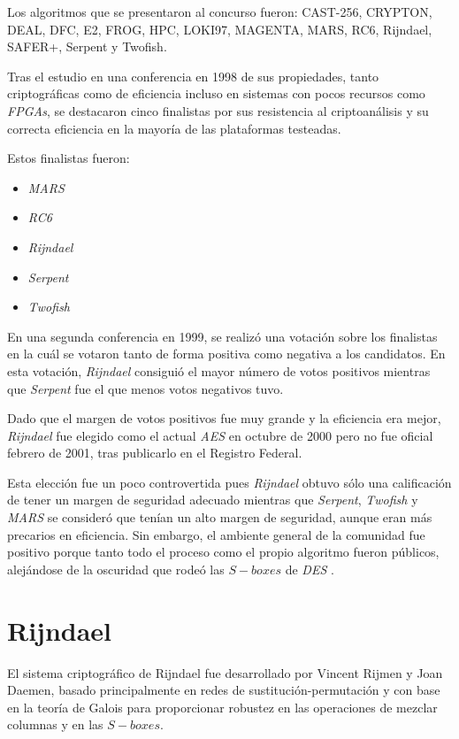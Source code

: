 Los algoritmos que se presentaron al concurso fueron: CAST-256, CRYPTON, DEAL, DFC, E2, FROG, HPC, LOKI97, MAGENTA, MARS, RC6, Rijndael, SAFER+, Serpent y Twofish.

Tras el estudio en una conferencia en 1998 de sus propiedades, tanto criptográficas como de eficiencia incluso en sistemas con pocos recursos como \textit{FPGAs}, se destacaron cinco finalistas por sus resistencia al criptoanálisis y su correcta eficiencia en la mayoría de las plataformas testeadas.

Estos finalistas fueron:
\begin{itemize}
	\item \textit{MARS}
	\item \textit{RC6}
	\item \textit{Rijndael}
	\item \textit{Serpent}
	\item \textit{Twofish}
\end{itemize}

En una segunda conferencia en 1999, se realizó una votación sobre los finalistas en la cuál se votaron tanto de forma positiva como negativa a los candidatos. En esta votación, \textit{Rijndael} consiguió el mayor número de votos positivos mientras que \textit{Serpent} fue el que menos votos negativos tuvo.

Dado que el margen de votos positivos fue muy grande y la eficiencia era mejor, \textit{Rijndael} fue elegido como el actual \textit{AES} en octubre de 2000 pero no fue oficial febrero de 2001, tras publicarlo en el Registro Federal. 

Esta elección fue un poco controvertida pues \textit{Rijndael} obtuvo sólo una calificación de tener un margen de seguridad adecuado mientras que \textit{Serpent}, \textit{Twofish} y \textit{MARS} se consideró que tenían un alto margen de seguridad, aunque eran más precarios en eficiencia. Sin embargo, el ambiente general de la comunidad fue positivo porque tanto todo el proceso como el propio algoritmo fueron públicos, alejándose de la oscuridad que rodeó las $S-boxes$ de \textit{DES} \cite{AES_process} \cite{Rijndael_AES_process}.

\section{Rijndael}
\label{sec:Rijndael}
El sistema criptográfico de Rijndael fue desarrollado por Vincent Rijmen y Joan Daemen, basado principalmente en redes de sustitución-permutación y con base en la teoría de Galois para proporcionar robustez en las operaciones de mezclar columnas y en las $S-boxes$.

